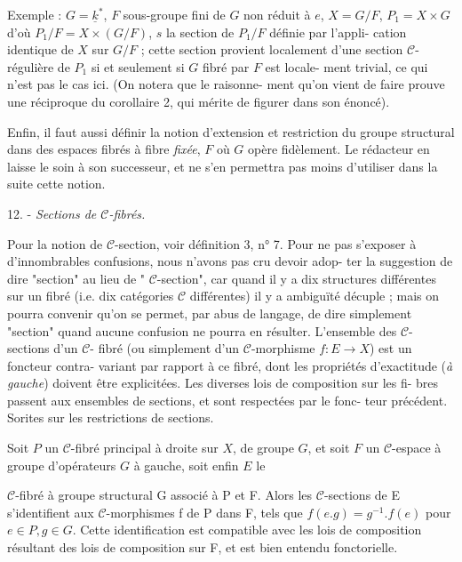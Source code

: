 \newpage



Exemple : $G = \underline{k}^*$, $F$ sous-groupe fini de $G$ non réduit à $e$, $X = G/F$,
$P_1 = X \times G$ d'où $P_1/F = X \times (G/F)$, $s$ la section de $P_1/F$ définie par l'appli-
cation identique de $X$ sur $G/F$ ; cette section provient localement d'une
section $\mathcal{C}$-régulière de $P_1$ si et seulement si $G$ fibré par $F$ est locale-
ment trivial, ce qui n'est pas le cas ici. (On notera que le raisonne-
ment qu'on vient de faire prouve une réciproque du corollaire 2, qui
mérite de figurer dans son énoncé).

Enfin, il faut aussi définir la notion d'extension et restriction
du groupe structural dans des espaces fibrés à fibre \emph{fixée}, $F$ où $G$ opère
fidèlement. Le rédacteur en laisse le soin à son successeur, et ne s'en
permettra pas moins d'utiliser dans la suite cette notion.

12. - \emph{Sections de $\mathcal{C}$-fibrés.}

Pour la notion de $\mathcal{C}$-section, voir définition 3, n° 7. Pour ne pas
s'exposer à d'innombrables confusions, nous n'avons pas cru devoir adop-
ter la suggestion de dire "section" au lieu de " $\mathcal{C}$-section", car
quand il y a dix structures différentes sur un fibré (i.e. dix catégories
$\mathcal{C}$ différentes) il y a ambiguïté décuple ; mais on pourra convenir qu'on
se permet, par abus de langage, de dire simplement "section" quand aucune
confusion ne pourra en résulter. L'ensemble des $\mathcal{C}$-sections d'un $\mathcal{C}$-
fibré (ou simplement d'un $\mathcal{C}$-morphisme $f:E \to X$) est un foncteur contra-
variant par rapport à ce fibré, dont les propriétés d'exactitude (\emph{à gauche})
doivent être explicitées. Les diverses lois de composition sur les fi-
bres passent aux ensembles de sections, et sont respectées par le fonc-
teur précédent. Sorites sur les restrictions de sections.

Soit $P$ un $\mathcal{C}$-fibré principal à droite sur $X$, de groupe $G$, et soit
$F$ un $\mathcal{C}$-espace à groupe d'opérateurs $G$ à gauche, soit enfin $E$ le

\newpage



$\mathcal{C}$-fibré à groupe structural G associé à P et F. Alors les $\mathcal{C}$-sections
de E s'identifient aux $\mathcal{C}$-morphismes f de P dans F, tels que
$f(e.g) = g^{-1}.f(e)$ pour $e \in P, g \in G$. Cette identification est compatible avec
les lois de composition résultant des lois de composition sur F, et est
bien entendu fonctorielle.

